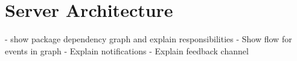\section{Server Architecture}

- show package dependency graph
  and explain responsibilities
- Show flow for events in graph
- Explain notifications
- Explain feedback channel

